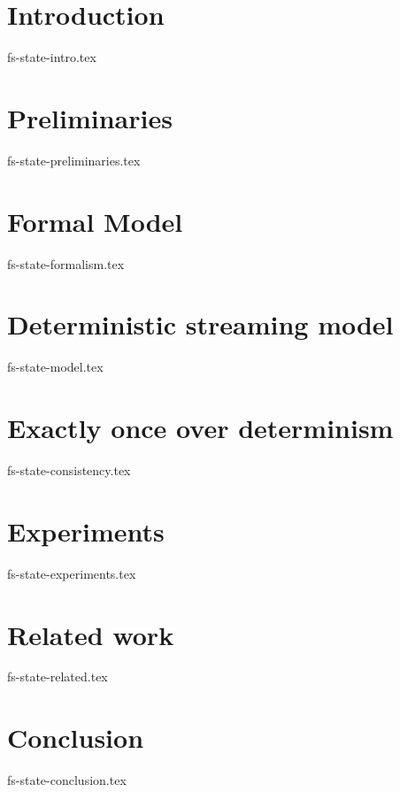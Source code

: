 \documentclass{vldb}
\theoremstyle{definition}
\begin{document}
\section {Introduction}
 {fs-state-intro.tex}

\section {Preliminaries}
 {fs-state-preliminaries.tex}

\section {Formal Model}
 {fs-state-formalism.tex}

\section {Deterministic streaming model}
 {fs-state-model.tex}

\section{Exactly once over determinism}
 {fs-state-consistency.tex}

\section {Experiments}
 {fs-state-experiments.tex}

\section {Related work}
 {fs-state-related.tex}

\section {Conclusion}
 {fs-state-conclusion.tex}

\balance



\end{document}
